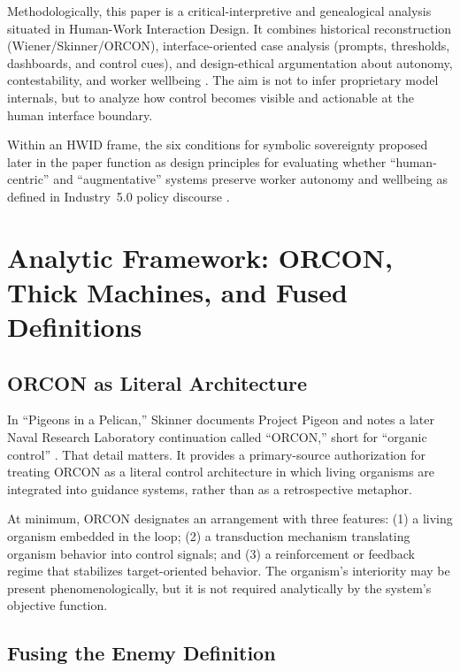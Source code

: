 \documentclass[runningheads]{llncs}
\begin{document}
Methodologically, this paper is a critical-interpretive and genealogical analysis situated in Human-Work Interaction Design. It combines historical reconstruction (Wiener/Skinner/ORCON), interface-oriented case analysis (prompts, thresholds, dashboards, and control cues), and design-ethical argumentation about autonomy, contestability, and worker wellbeing \cite{geertz1973interpretation,kellogg2020algorithms,disalvo2012adversarial}. The aim is not to infer proprietary model internals, but to analyze how control becomes visible and actionable at the human interface boundary.

Within an HWID frame, the six conditions for symbolic sovereignty proposed later in the paper function as design principles for evaluating whether ``human-centric'' and ``augmentative'' systems preserve worker autonomy and wellbeing as defined in Industry~5.0 policy discourse \cite{breque2021industry,hwid2026cfp}.

\section{Analytic Framework: ORCON, Thick Machines, and Fused Definitions}

\subsection{ORCON as Literal Architecture}

In ``Pigeons in a Pelican,'' Skinner documents Project Pigeon and notes a later Naval Research Laboratory continuation called ``ORCON,'' short for ``organic control'' \cite{skinner1960pigeons}. That detail matters. It provides a primary-source authorization for treating ORCON as a literal control architecture in which living organisms are integrated into guidance systems, rather than as a retrospective metaphor.

At minimum, ORCON designates an arrangement with three features: (1) a living organism embedded in the loop; (2) a transduction mechanism translating organism behavior into control signals; and (3) a reinforcement or feedback regime that stabilizes target-oriented behavior. The organism's interiority may be present phenomenologically, but it is not required analytically by the system's objective function.

\subsection{Fusing the Enemy Definition}
\end{document}
